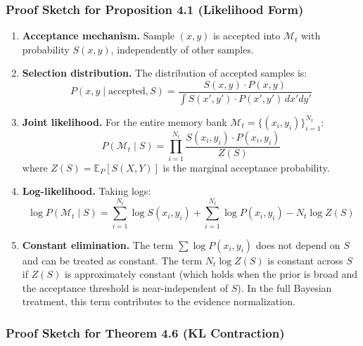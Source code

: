 \documentclass[
  12pt,
]{article}
\begin{document}
\subsubsection{Proof Sketch for Proposition 4.1 (Likelihood
Form)}\label{proof-sketch-for-proposition-4.1-likelihood-form}

\begin{enumerate}
\def\labelenumi{\arabic{enumi}.}
\item
  \textbf{Acceptance mechanism.} Sample \((x,y)\) is accepted into
  \(\mathcal{M}_t\) with probability \(S(x,y)\), independently of other
  samples.
\item
  \textbf{Selection distribution.} The distribution of accepted samples
  is: \[
  P(x,y \mid \text{accepted}, S) = \frac{S(x,y) \cdot P(x,y)}{\int S(x',y') \cdot P(x',y') \, dx' dy'}
  \]
\item
  \textbf{Joint likelihood.} For the entire memory bank
  \(\mathcal{M}_t = \{(x_i, y_i)\}_{i=1}^{N_t}\): \[
  P(\mathcal{M}_t \mid S) = \prod_{i=1}^{N_t} \frac{S(x_i, y_i) \cdot P(x_i, y_i)}{Z(S)}
  \] where \(Z(S) = \mathbb{E}_{P}[S(X,Y)]\) is the marginal acceptance
  probability.
\item
  \textbf{Log-likelihood.} Taking logs: \[
  \log P(\mathcal{M}_t \mid S) = \sum_{i=1}^{N_t} \log S(x_i, y_i) + \sum_{i=1}^{N_t} \log P(x_i, y_i) - N_t \log Z(S)
  \]
\item
  \textbf{Constant elimination.} The term \(\sum \log P(x_i, y_i)\) does
  not depend on \(S\) and can be treated as constant. The term
  \(N_t \log Z(S)\) is constant across \(S\) if \(Z(S)\) is
  approximately constant (which holds when the prior is broad and the
  acceptance threshold is near-independent of \(S\)). In the full
  Bayesian treatment, this term contributes to the evidence
  normalization.
\end{enumerate}

\subsubsection{Proof Sketch for Theorem 4.6 (KL
Contraction)}\label{proof-sketch-for-theorem-4.6-kl-contraction}
\end{document}
